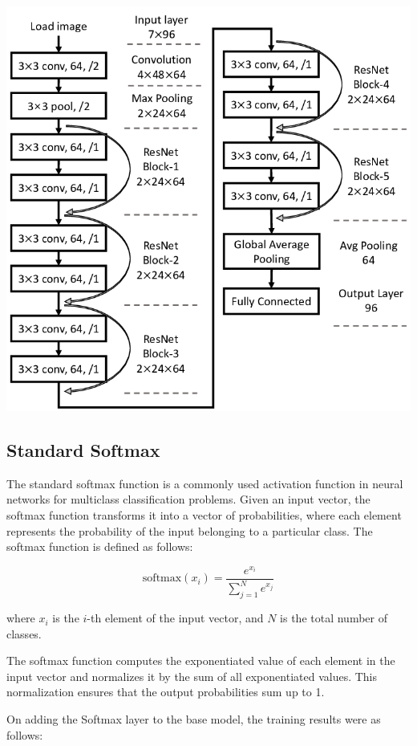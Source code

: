 \documentclass{article}
\begin{document}
\includegraphics[scale=0.3]{images/The-structure-of-ResNet-12.png}

\subsection{Standard Softmax}

The standard softmax function is a commonly used activation function in neural networks for multiclass classification problems. Given an input vector, the softmax function transforms it into a vector of probabilities, where each element represents the probability of the input belonging to a particular class. The softmax function is defined as follows:

\[
\text{softmax}(x_i) = \frac{e^{x_i}}{\sum_{j=1}^{N}e^{x_j}}
\]

where \(x_i\) is the \(i\)-th element of the input vector, and \(N\) is the total number of classes.

The softmax function computes the exponentiated value of each element in the input vector and normalizes it by the sum of all exponentiated values. This normalization ensures that the output probabilities sum up to 1.


On adding the Softmax layer to the base model, the training results were as follows: \\
\end{document}
